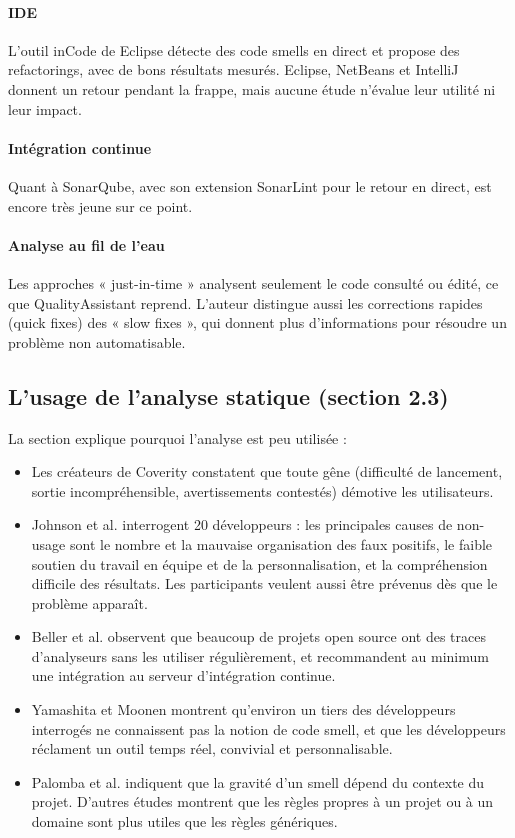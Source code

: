 \documentclass[11pt,a4paper]{article}
\begin{document}
\paragraph{IDE}

L’outil inCode de Eclipse détecte des code smells en direct et propose des refactorings, avec de bons résultats mesurés. Eclipse, NetBeans et IntelliJ donnent un retour pendant la frappe, mais aucune étude n’évalue leur utilité ni leur impact.

\paragraph{Intégration continue}

Quant à SonarQube, avec son extension SonarLint pour le retour en direct, est encore très jeune sur ce point.

\paragraph{Analyse au fil de l’eau}

Les approches « just-in-time » analysent seulement le code consulté ou édité, ce que QualityAssistant reprend. L’auteur distingue aussi les corrections rapides (quick fixes) des « slow fixes », qui donnent plus d’informations pour résoudre un problème non automatisable.

\subsection{L’usage de l’analyse statique (section 2.3)}

La section explique pourquoi l’analyse est peu utilisée :

\begin{itemize}
  \item Les créateurs de Coverity constatent que toute gêne (difficulté de lancement, sortie incompréhensible, avertissements contestés) démotive les utilisateurs.
  \item Johnson et al. interrogent 20 développeurs : les principales causes de non-usage sont le nombre et la mauvaise organisation des faux positifs, le faible soutien du travail en équipe et de la personnalisation, et la compréhension difficile des résultats. Les participants veulent aussi être prévenus dès que le problème apparaît.
  \item Beller et al. observent que beaucoup de projets open source ont des traces d’analyseurs sans les utiliser régulièrement, et recommandent au minimum une intégration au serveur d’intégration continue.
  \item Yamashita et Moonen montrent qu’environ un tiers des développeurs interrogés ne connaissent pas la notion de code smell, et que les développeurs réclament un outil temps réel, convivial et personnalisable.
  \item Palomba et al. indiquent que la gravité d’un smell dépend du contexte du projet. D’autres études montrent que les règles propres à un projet ou à un domaine sont plus utiles que les règles génériques.
\end{itemize}
\end{document}
